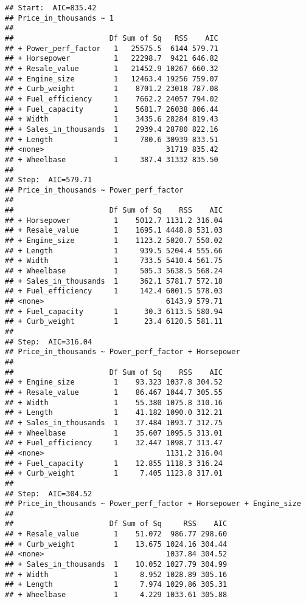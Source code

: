 \documentclass[
]{article}
\begin{document}
\begin{verbatim}
## Start:  AIC=835.42
## Price_in_thousands ~ 1
## 
##                      Df Sum of Sq   RSS    AIC
## + Power_perf_factor   1   25575.5  6144 579.71
## + Horsepower          1   22298.7  9421 646.82
## + Resale_value        1   21452.9 10267 660.32
## + Engine_size         1   12463.4 19256 759.07
## + Curb_weight         1    8701.2 23018 787.08
## + Fuel_efficiency     1    7662.2 24057 794.02
## + Fuel_capacity       1    5681.7 26038 806.44
## + Width               1    3435.6 28284 819.43
## + Sales_in_thousands  1    2939.4 28780 822.16
## + Length              1     780.6 30939 833.51
## <none>                            31719 835.42
## + Wheelbase           1     387.4 31332 835.50
## 
## Step:  AIC=579.71
## Price_in_thousands ~ Power_perf_factor
## 
##                      Df Sum of Sq    RSS    AIC
## + Horsepower          1    5012.7 1131.2 316.04
## + Resale_value        1    1695.1 4448.8 531.03
## + Engine_size         1    1123.2 5020.7 550.02
## + Length              1     939.5 5204.4 555.66
## + Width               1     733.5 5410.4 561.75
## + Wheelbase           1     505.3 5638.5 568.24
## + Sales_in_thousands  1     362.1 5781.7 572.18
## + Fuel_efficiency     1     142.4 6001.5 578.03
## <none>                            6143.9 579.71
## + Fuel_capacity       1      30.3 6113.5 580.94
## + Curb_weight         1      23.4 6120.5 581.11
## 
## Step:  AIC=316.04
## Price_in_thousands ~ Power_perf_factor + Horsepower
## 
##                      Df Sum of Sq    RSS    AIC
## + Engine_size         1    93.323 1037.8 304.52
## + Resale_value        1    86.467 1044.7 305.55
## + Width               1    55.380 1075.8 310.16
## + Length              1    41.182 1090.0 312.21
## + Sales_in_thousands  1    37.484 1093.7 312.75
## + Wheelbase           1    35.607 1095.5 313.01
## + Fuel_efficiency     1    32.447 1098.7 313.47
## <none>                            1131.2 316.04
## + Fuel_capacity       1    12.855 1118.3 316.24
## + Curb_weight         1     7.405 1123.8 317.01
## 
## Step:  AIC=304.52
## Price_in_thousands ~ Power_perf_factor + Horsepower + Engine_size
## 
##                      Df Sum of Sq     RSS    AIC
## + Resale_value        1    51.072  986.77 298.60
## + Curb_weight         1    13.675 1024.16 304.44
## <none>                            1037.84 304.52
## + Sales_in_thousands  1    10.052 1027.79 304.99
## + Width               1     8.952 1028.89 305.16
## + Length              1     7.974 1029.86 305.31
## + Wheelbase           1     4.229 1033.61 305.88

\end{verbatim}
\end{document}
